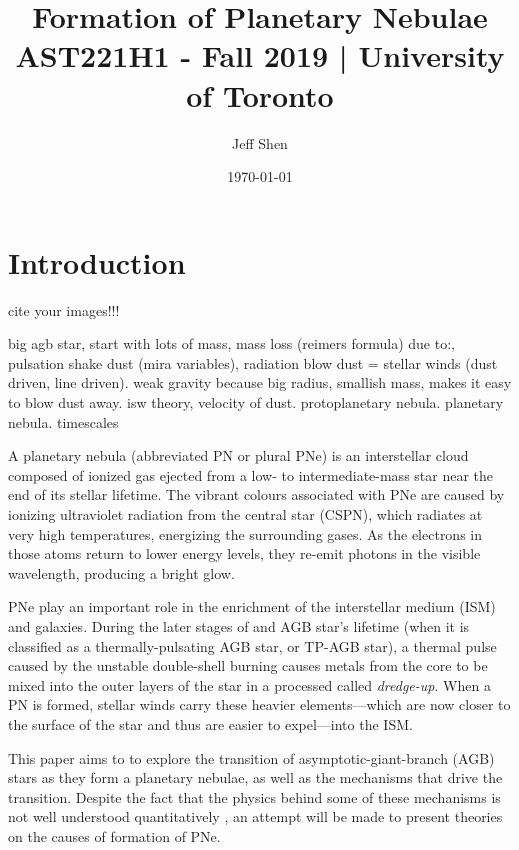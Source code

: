 \documentclass[a4paper,11pt,twocolumn]{article}
\begin{document}
\title{Formation of Planetary Nebulae\\
    \large AST221H1 - Fall 2019 | University of Toronto}
\author{Jeff Shen}
\date{\today}
\maketitle

\section{Introduction}

{\huge cite your images!!!}

{\huge big agb star, start with lots of mass, mass loss (reimers formula) due to:, pulsation shake dust (mira variables), radiation blow dust = stellar winds (dust driven, line driven). weak gravity because big radius, smallish mass, makes it easy to blow dust away. isw theory, velocity of dust. protoplanetary nebula. planetary nebula. timescales}

A planetary nebula (abbreviated PN or plural PNe) is an interstellar cloud composed of ionized gas ejected from a low- to intermediate-mass star near the end of its stellar lifetime. The vibrant colours associated with PNe are caused by ionizing ultraviolet radiation from the central star (CSPN), which radiates at very high temperatures, energizing the surrounding gases. As the electrons in those atoms return to lower energy levels, they re-emit photons in the visible wavelength, producing a bright glow. 


PNe play an important role in the enrichment of the interstellar medium (ISM) and galaxies. During the later stages of and AGB star's lifetime (when it is classified as a thermally-pulsating AGB star, or TP-AGB star), a thermal pulse caused by the unstable double-shell burning causes metals from the core to be mixed into the outer layers of the star in a processed called \textit{dredge-up}. When a PN is formed, stellar winds carry these heavier elements—which are now closer to the surface of the star and thus are easier to expel—into the ISM. \cite{iben} 


This paper aims to to explore the transition of asymptotic-giant-branch (AGB) stars as they form a planetary nebulae, as well as the mechanisms that drive the transition. Despite the fact that the physics behind some of these mechanisms is not well understood quantitatively \cite{schoenberner}, an attempt will be made to present theories on the causes of formation of PNe.
\end{document}

